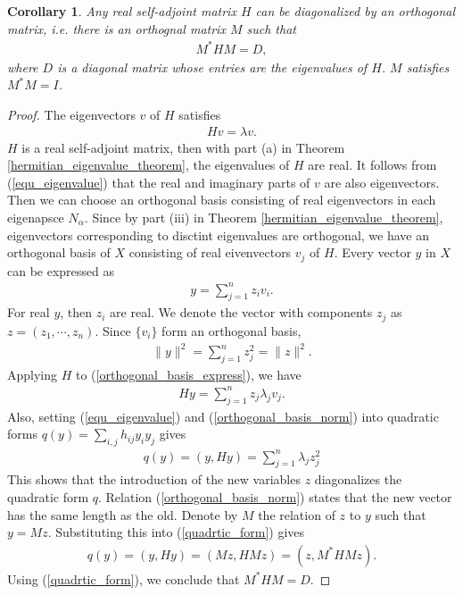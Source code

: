 \documentclass[10pt]{book}
\newtheorem{corollary}{Corollary}[theorem]
\theoremstyle{definition}
\numberwithin{equation}{chapter}
\begin{document}
\begin{corollary}\label{self-adjoint-diagonal}
Any real self-adjoint matrix $H$ can be diagonalized by an orthogonal matrix, i.e. there is an orthognal matrix $M$ such that 
\begin{align*}
    M^* H M = D,
\end{align*}
where $D$ is a diagonal matrix whose entries are the eigenvalues of $H$. $M$ satisfies $M^*M = I$.
\end{corollary}
\begin{proof}
The eigenvectors $v$ of $H$ satisfies 
\begin{align}\label{equ_eigenvalue}
    Hv = \lambda v.
\end{align}
$H$ is a real self-adjoint matrix, then with part (a) in Theorem \ref{hermitian_eigenvalue_theorem}, the eigenvalues of $H$ are real. It follows from (\ref{equ_eigenvalue}) that the real and imaginary parts of $v$ are also eigenvectors. Then we can choose an orthogonal basis consisting of real eigenvectors in each eigenapsce $N_\alpha$. Since by part (iii) in Theorem \ref{hermitian_eigenvalue_theorem}, eigenvectors corresponding to disctint eigenvalues are orthogonal, we have an orthogonal basis of $X$ consisting of real eivenvectors $v_j$ of $H$. Every vector $y$ in $X$ can be expressed as
\begin{align}\label{orthogonal_basis_express}
    y = \sum^n_{j=1} z_i v_i.
\end{align}
For real $y$, then $z_i$ are real. We denote the vector with components $z_j$ as $z = \left(z_1, \cdots, z_n\right)$. Since $\{v_i\}$ form an orthogonal basis, 
\begin{align}\label{orthogonal_basis_norm}
    \|y\|^2 = \sum^n_{j=1} z_j^2 = \|z\|^2.
\end{align}
Applying $H$ to (\ref{orthogonal_basis_express}), we have \begin{align*}
    Hy = \sum^n_{j=1} z_j \lambda_j v_j.
\end{align*}
Also, setting (\ref{equ_eigenvalue}) and (\ref{orthogonal_basis_norm}) into quadratic forms $q(y) = \sum_{i,j}h_{ij} y_i y_j$ gives
\begin{align}\label{quadrtic_form}
    q(y) = (y, Hy) = \sum^n_{j=1} \lambda_j z_j^2
\end{align} 
This shows that the introduction of the new variables $z$ diagonalizes the quadratic form $q$. Relation (\ref{orthogonal_basis_norm}) states that the new vector has the same length as the old. Denote by $M$ the relation of $z$ to $y$ such that $y = Mz$. Substituting this into (\ref{quadrtic_form}) gives
\begin{align*}
    q(y) = (y, Hy) = (Mz, HMz) = (z, M^*HMz).
\end{align*}
Using (\ref{quadrtic_form}), we conclude that $M^*HM = D$.
\end{proof}
\end{document}
